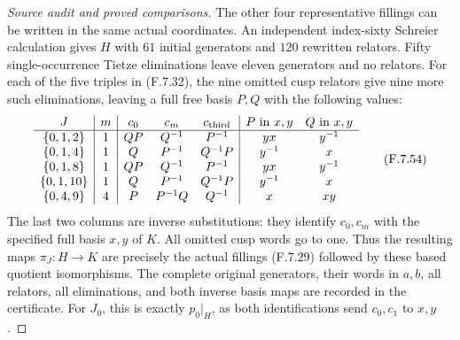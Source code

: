 \begin{proof}[Source audit and proved comparisons]
The other four representative fillings can be
written in the same actual coordinates.
An independent index-sixty Schreier calculation
gives $H$ with $61$ initial generators and
$120$ rewritten relators.  Fifty single-occurrence
Tietze eliminations leave eleven generators and
no relators.  For each of the five triples in
(F.7.32), the nine omitted cusp relators give
nine more such eliminations, leaving a full
free basis $P,Q$ with the following values:
\[
 \begin{array}{c|c|ccc|cc}
 J&m&c_0&c_m&c_{\rm third}&P\text{ in }x,y&Q\text{ in }x,y\\ \hline
 \{0,1,2\}&1&QP&Q^{-1}&P^{-1}&yx&y^{-1}\\
 \{0,1,4\}&1&Q&P^{-1}&Q^{-1}P&y^{-1}&x\\
 \{0,1,8\}&1&QP&Q^{-1}&P^{-1}&yx&y^{-1}\\
 \{0,1,10\}&1&Q&P^{-1}&Q^{-1}P&y^{-1}&x\\
 \{0,4,9\}&4&P&P^{-1}Q&Q^{-1}&x&xy
 \end{array}                                                   \tag{F.7.54}
\]
The last two columns are inverse substitutions:
they identify $c_0,c_m$ with the specified full
basis $x,y$ of $K$.
All omitted cusp words go to one.
Thus the resulting maps
$\pi_J:H\to K$ are precisely the actual fillings
(F.7.29) followed by these based quotient
isomorphisms.  The complete original generators,
their words in $a,b$, all relators, all
eliminations, and both inverse basis maps
are recorded in the certificate.
For $J_0$, this is exactly $p_0|_H$,
as both identifications send $c_0,c_1$ to $x,y$.


\end{proof}
